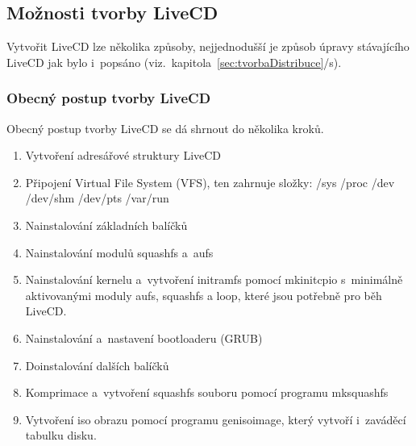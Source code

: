 \documentclass[a4paper,12pt]{article}
\newcommand{\odkazNaKapitolu}[1]{(viz.~kapitola~\ref{#1}/s\pageref{#1})}
\begin{document}
\subsection{Možnosti tvorby LiveCD}
Vytvořit LiveCD lze několika způsoby, nejjednodušší je způsob úpravy stávajícího LiveCD jak bylo i~popsáno \odkazNaKapitolu{sec:tvorbaDistribuce}. 

\subsubsection{Obecný postup tvorby LiveCD}
Obecný postup tvorby LiveCD se dá shrnout do několika kroků.
\begin{enumerate}
 \item Vytvoření adresářové struktury LiveCD
 \item Připojení Virtual File System (VFS), ten zahrnuje složky: /sys /proc /dev /dev/shm /dev/pts /var/run
 \item Nainstalování základních balíčků
 \item Nainstalování modulů squashfs a~aufs
 \item Nainstalování kernelu a~vytvoření initramfs pomocí mkinitcpio s~minimálně aktivovanými moduly aufs, squashfs a loop, které jsou potřebně pro běh LiveCD.
 \item Nainstalování a~nastavení bootloaderu (GRUB)
 \item Doinstalování dalších balíčků
 \item Komprimace a~vytvoření squashfs souboru pomocí programu mksquashfs
 \item Vytvoření iso obrazu pomocí programu genisoimage, který vytvoří i~zaváděcí tabulku disku.
\end{enumerate}
\end{document}
